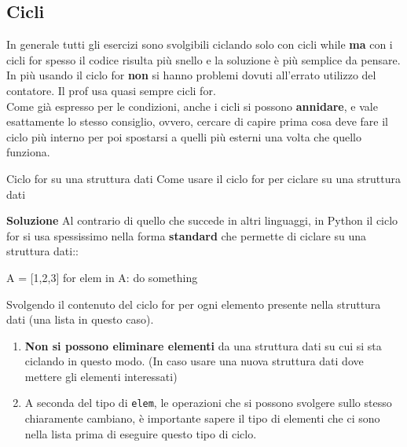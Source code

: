 \documentclass[10pt]{extarticle}
\makeatletter
\newcommand{\<}{\langle}
\renewcommand{\>}{\rangle}
\renewenvironment{proof}[1][\proofname] {\par\pushQED{\qed}
\renewcommand*{\proofname}{Soluzione}
{\normalfont\sffamily\bfseries\topsep6\p@\@plus6\p@\relax #1\@addpunct{.} }}{\popQED\endtrivlist\@endpefalse}
\theoremstyle{mystyle}{\newtheorem*{remark}{Nota}}
\theoremstyle{mystyle}{\newtheorem*{remarks}{Note}}
\theoremstyle{mystyle}{\newtheorem*{example}{Esempio}}
\theoremstyle{mystyle}{\newtheorem*{examples}{Esempi}}
\theoremstyle{definition}{\newtheorem*{exercise}{Exercise}}
\theoremstyle{warn}
\makeatother
\begin{document}
\newpage
\subsection{Cicli}
In generale tutti gli esercizi sono svolgibili ciclando solo con cicli while \textbf{ma} con i cicli for spesso il codice risulta più snello e la soluzione è più semplice da pensare. In più usando il ciclo for \textbf{non} si hanno problemi dovuti all'errato utilizzo del contatore. Il prof usa quasi sempre cicli for.\\
Come già espresso per le condizioni, anche i cicli si possono \textbf{annidare}, e vale esattamente lo stesso consiglio, ovvero, cercare di capire prima cosa deve fare il ciclo più interno per poi spostarsi a quelli più esterni una volta che quello funziona.

\begin{definition}{Ciclo for su una struttura dati}{}
Come usare il ciclo for per ciclare su una struttura dati
\end{definition}
\begin{proof}
Al contrario di quello che succede in altri linguaggi, in Python il ciclo for si usa spessissimo nella forma \textbf{standard} che permette di ciclare su una struttura dati::
\begin{python}
A = [1,2,3]
for elem in A:
    do something
\end{python}
Svolgendo il contenuto del ciclo for per ogni elemento presente nella struttura dati (una lista in questo caso).
\end{proof}
\begin{remarks} \leavevmode
\begin{enumerate}
    \item \textbf{Non si possono eliminare elementi} da una struttura dati su cui si sta ciclando in questo modo. (In caso usare una nuova struttura dati dove mettere gli elementi interessati)
    \item A seconda del tipo di \texttt{elem}, le operazioni che si possono svolgere sullo stesso chiaramente cambiano, è importante sapere il tipo di elementi che ci sono nella lista prima di eseguire questo tipo di ciclo.
\end{enumerate}
\end{remarks}
\end{document}
